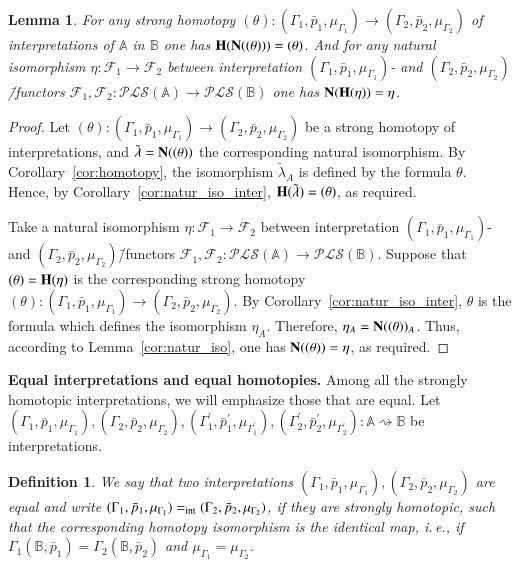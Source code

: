 \documentclass[12pt]{article}
\newtheorem{lemma}{Lemma}
\newtheorem{definition}{Definition}
\theoremstyle{definition}
\def\MA{{\mathbb{A}}}
\def\MB{{\mathbb{B}}}
\def\F{{\mathcal{F}}}
\def\PLS{{\mathcal{PLS}}}
\begin{document}
\begin{lemma}\label{le:natur_iso}
For any strong homotopy $(\theta)\colon (\Gamma_1,\bar p_1,\mu_{\Gamma_1})\to(\Gamma_2,\bar p_2,\mu_{\Gamma_2})$ of interpretations of $\MA$ in $\MB$ one has ${\bf H}({\bf N}((\theta)))=(\theta)$. And for any natural isomorphism $\eta\colon \F_1\to\F_2$
 between interpretation $(\Gamma_1,\bar p_1,\mu_{\Gamma_1})$- and $(\Gamma_2,\bar p_2,\mu_{\Gamma_2})$\=/functors $\F_1,\F_2\colon \PLS(\MA)\to \PLS(\MB)$ one has ${\bf N}({\bf H}(\eta))=\eta$.
 \end{lemma}

 \begin{proof}
Let  $(\theta)\colon (\Gamma_1,\bar p_1,\mu_{\Gamma_1})\to(\Gamma_2,\bar p_2,\mu_{\Gamma_2})$ be a strong homotopy of interpretations, and $\tilde\lambda={\bf N}((\theta))$ the corresponding natural isomorphism. By Corollary~\ref{cor:homotopy}, the isomorphism $\tilde\lambda_A$ is defined by the formula $\theta$. Hence, by Corollary~\ref{cor:natur_iso_inter}, ${\bf H}(\tilde\lambda)=(\theta)$, as required.
 
Take a natural isomorphism $\eta\colon \F_1\to\F_2$ between interpretation $(\Gamma_1,\bar p_1,\mu_{\Gamma_1})$- and $(\Gamma_2,\bar p_2,\mu_{\Gamma_2})$\=/functors $\F_1,\F_2\colon \PLS(\MA)\to \PLS(\MB)$. Suppose that $(\theta)={\bf H}(\eta)$ is the corresponding strong homotopy $(\theta)\colon (\Gamma_1,\bar p_1,\mu_{\Gamma_1})\to(\Gamma_2,\bar p_2,\mu_{\Gamma_2})$. By Corollary~\ref{cor:natur_iso_inter}, $\theta$ is the formula which defines the isomorphism $\eta_A$. Therefore, $\eta_A={\bf N}((\theta))_A$. Thus, according to Lemma~\ref{cor:natur_iso}, one has 
${\bf N}((\theta))=\eta$, as required.  
\end{proof}

{\bf Equal interpretations and equal homotopies.} Among all the strongly homotopic interpretations, we will emphasize those that are equal. Let $(\Gamma_1,\bar p_1,\mu_{\Gamma_1}),(\Gamma_2,\bar p_2,\mu_{\Gamma_2}),  (\Gamma^\prime_1,\bar p^\prime_1,\mu_{\Gamma^\prime_1}), (\Gamma^\prime_2,\bar p^\prime_2,\mu_{\Gamma^\prime_2})\colon \MA\rightsquigarrow\MB$ be interpretations.

\begin{definition}\label{def:equal}
We say that two interpretations $(\Gamma_1,\bar p_1,\mu_{\Gamma_1}),(\Gamma_2,\bar p_2,\mu_{\Gamma_2})$ are {\em equal} and write $(\Gamma_1,\bar p_1,\mu_{\Gamma_1})=_{\rm int}(\Gamma_2,\bar p_2,\mu_{\Gamma_2})$, if they are strongly homotopic, such that the corresponding homotopy isomorphism is the identical map, i.\,e., if $\Gamma_1(\MB,\bar p_1)=\Gamma_2(\MB,\bar p_2)$ and $\mu_{\Gamma_1}=\mu_{\Gamma_2}$. 
\end{definition}
\end{document}
